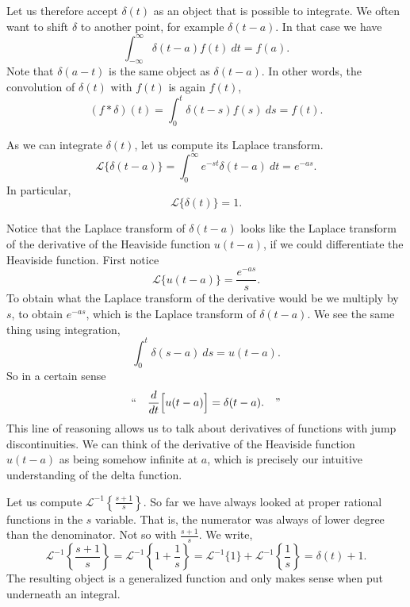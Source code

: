 Let us therefore accept $\delta(t)$ as an object that is possible to
integrate.  We often want to shift $\delta$ to another point, for example
$\delta(t-a)$.  In that case we have
\begin{equation*}
\int_{-\infty}^\infty \delta(t-a) f(t) ~dt = f(a) .
\end{equation*}
Note that $\delta(a-t)$ is the same object as $\delta(t-a)$.
In other words, the convolution of $\delta(t)$ with $f(t)$ is again $f(t)$,
\begin{equation*}
(f * \delta) (t) = 
\int_{0}^t \delta(t-s) f(s) ~ds
= f(t) .
\end{equation*}

As we can integrate $\delta(t)$, let us compute its Laplace transform.
\begin{equation*}
\boxed{~~
{\mathcal{L}} \bigl\{ \delta(t-a) \bigr\}
=
\int_{0}^\infty e^{-st} \delta(t-a) ~dt = e^{-as} .
~~}
\end{equation*}
In particular,
\begin{equation*}
{\mathcal{L}} \bigl\{ \delta(t) \bigr\} = 1 .
\end{equation*}

\begin{remark}
Notice that the Laplace transform of $\delta(t-a)$ looks like
the Laplace transform of the derivative of the Heaviside function
$u(t-a)$, if we could differentiate the Heaviside function.
First notice
\begin{equation*}
{\mathcal{L}} \bigl\{ u(t-a) \bigr\} = \frac{e^{-as}}{s}.
\end{equation*}
To obtain what the Laplace transform of the derivative would be
we multiply by $s$, to obtain $e^{-as}$, which is the Laplace transform
of $\delta(t-a)$.
We see the same thing using integration,
\begin{equation*}
\int_0^t \delta(s-a)~ds = u(t-a) .
\end{equation*}
So in a certain sense
\begin{equation*}
\text{``} \quad \frac{d}{dt} \Bigl[ u(t-a) \Bigr] = \delta(t-a) . \quad \text{''}
\end{equation*}
This line of reasoning allows us to talk about derivatives of functions with jump
discontinuities.
We can think of
the derivative of the Heaviside function $u(t-a)$ as being somehow infinite
at $a$, which is precisely our intuitive understanding of the delta
function.
\end{remark}

\begin{example}
Let us compute ${\mathcal{L}}^{-1} \left\{ \frac{s+1}{s} \right\}$.  So
far we have always looked at proper rational functions in the $s$ variable.
That is, the numerator was always of lower degree than the denominator.
Not so with $\frac{s+1}{s}$.
We write,
\begin{equation*}
{\mathcal{L}}^{-1} \left\{ \frac{s+1}{s} \right\}
=
{\mathcal{L}}^{-1} \left\{ 1 + \frac{1}{s} \right\}
=
{\mathcal{L}}^{-1} \{ 1 \}
+
{\mathcal{L}}^{-1} \left\{ \frac{1}{s} \right\}
=
\delta(t) + 1 .
\end{equation*}
The resulting object is a generalized
function and only makes sense when put underneath an integral.
\end{example}

